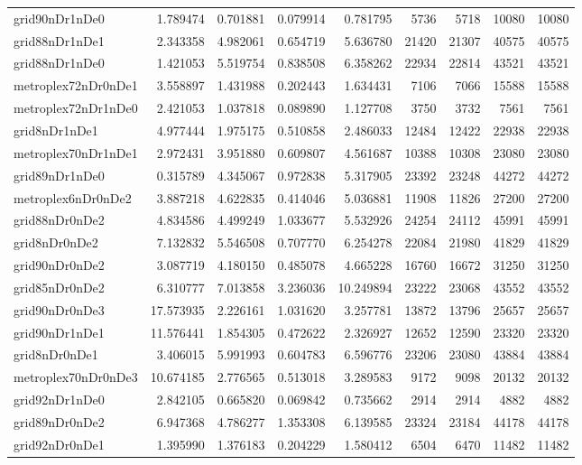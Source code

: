 \begin{longtable}{|l|r|r|r|r|r|r|r|r|}
grid90nDr1nDe0 & 1.789474 & 0.701881 & 0.079914 & 0.781795 & 5736 & 5718 & 10080 & 10080 \\
grid88nDr1nDe1 & 2.343358 & 4.982061 & 0.654719 & 5.636780 & 21420 & 21307 & 40575 & 40575 \\
grid88nDr1nDe0 & 1.421053 & 5.519754 & 0.838508 & 6.358262 & 22934 & 22814 & 43521 & 43521 \\
metroplex72nDr0nDe1 & 3.558897 & 1.431988 & 0.202443 & 1.634431 & 7106 & 7066 & 15588 & 15588 \\
metroplex72nDr1nDe0 & 2.421053 & 1.037818 & 0.089890 & 1.127708 & 3750 & 3732 & 7561 & 7561 \\
grid8nDr1nDe1 & 4.977444 & 1.975175 & 0.510858 & 2.486033 & 12484 & 12422 & 22938 & 22938 \\
metroplex70nDr1nDe1 & 2.972431 & 3.951880 & 0.609807 & 4.561687 & 10388 & 10308 & 23080 & 23080 \\
grid89nDr1nDe0 & 0.315789 & 4.345067 & 0.972838 & 5.317905 & 23392 & 23248 & 44272 & 44272 \\
metroplex6nDr0nDe2 & 3.887218 & 4.622835 & 0.414046 & 5.036881 & 11908 & 11826 & 27200 & 27200 \\
grid88nDr0nDe2 & 4.834586 & 4.499249 & 1.033677 & 5.532926 & 24254 & 24112 & 45991 & 45991 \\
grid8nDr0nDe2 & 7.132832 & 5.546508 & 0.707770 & 6.254278 & 22084 & 21980 & 41829 & 41829 \\
grid90nDr0nDe2 & 3.087719 & 4.180150 & 0.485078 & 4.665228 & 16760 & 16672 & 31250 & 31250 \\
grid85nDr0nDe2 & 6.310777 & 7.013858 & 3.236036 & 10.249894 & 23222 & 23068 & 43552 & 43552 \\
grid90nDr0nDe3 & 17.573935 & 2.226161 & 1.031620 & 3.257781 & 13872 & 13796 & 25657 & 25657 \\
grid90nDr1nDe1 & 11.576441 & 1.854305 & 0.472622 & 2.326927 & 12652 & 12590 & 23320 & 23320 \\
grid8nDr0nDe1 & 3.406015 & 5.991993 & 0.604783 & 6.596776 & 23206 & 23080 & 43884 & 43884 \\
metroplex70nDr0nDe3 & 10.674185 & 2.776565 & 0.513018 & 3.289583 & 9172 & 9098 & 20132 & 20132 \\
grid92nDr1nDe0 & 2.842105 & 0.665820 & 0.069842 & 0.735662 & 2914 & 2914 & 4882 & 4882 \\
grid89nDr0nDe2 & 6.947368 & 4.786277 & 1.353308 & 6.139585 & 23324 & 23184 & 44178 & 44178 \\
grid92nDr0nDe1 & 1.395990 & 1.376183 & 0.204229 & 1.580412 & 6504 & 6470 & 11482 & 11482 \\

\end{longtable}
